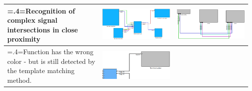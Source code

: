 \begin{table}[H]
\begin{tabularx}{\textwidth}{@{}>{\hsize=.4\hsize\linewidth=\hsize}X m{} m{}@{}}
        \midrule
        Recognition of complex signal intersections in close proximity &  
        \includegraphics[width=\linewidth]{pictures/correct_device_size_input_clip.png} & 
        \includegraphics[width=\linewidth]{pictures/correct_device_size_output_clip.png} \\

        \midrule
        Function has the wrong color - but is still detected by the template matching method. &  
        \includegraphics[width=\linewidth]{pictures/one_in_grey_input_clip.png} & 
        \\
        \bottomrule
    \end{tabularx}
\end{table}

